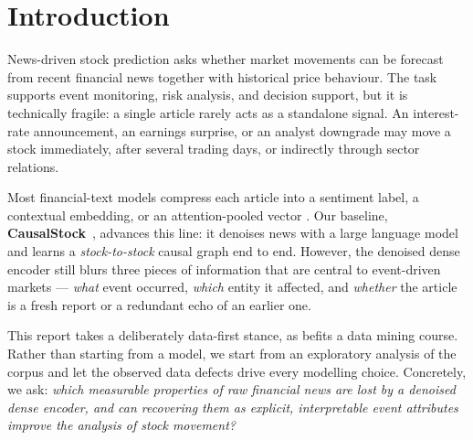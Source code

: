 \documentclass[sigconf,nonacm]{acmart}
\begin{document}

\maketitle

\section{Introduction}
News-driven stock prediction asks whether market movements can be
forecast from recent financial news together with historical price
behaviour. The task supports event monitoring, risk analysis, and
decision support, but it is technically fragile: a single article rarely
acts as a standalone signal. An interest-rate announcement, an earnings
surprise, or an analyst downgrade may move a stock immediately, after
several trading days, or indirectly through sector relations.

Most financial-text models compress each article into a sentiment label,
a contextual embedding, or an attention-pooled vector
\cite{finbert,hu2018,sawhney2020,sawhney2021,xu2018,xu2021}. Our
baseline, \textbf{CausalStock}~\cite{causalstock}, advances this line: it
denoises news with a large language model and learns a
\emph{stock-to-stock} causal graph end to end. However, the denoised
dense encoder still blurs three pieces of information that are central to
event-driven markets --- \emph{what} event occurred, \emph{which} entity
it affected, and \emph{whether} the article is a fresh report or a
redundant echo of an earlier one.

This report takes a deliberately data-first stance, as befits a data
mining course. Rather than starting from a model, we start from an
exploratory analysis of the corpus and let the observed data defects
drive every modelling choice. Concretely, we ask: \emph{which measurable
properties of raw financial news are lost by a denoised dense encoder,
and can recovering them as explicit, interpretable event attributes
improve the analysis of stock movement?}
\end{document}
